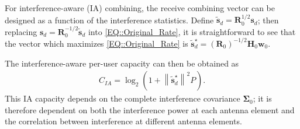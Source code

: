 \documentclass[12pt, draftclsnofoot, onecolumn]{IEEEtran}
\theoremstyle{plain}
\newcommand{\norm}[1]{\left\lVert#1\right\rVert}
\begin{document}
{For interference-aware (IA) combining, the receive combining vector can be designed as a function of the interference statistics. 
%
Define $\tilde{\textbf{s}}_d = \mathbf{R}_0^{1/2} \textbf{s}_d$; then replacing $\textbf{s}_d = \mathbf{R}_0^{-1/2} \tilde{\textbf{s}}_d$ into \eqref{EQ::Original_Rate}, it is straightforward to see that the vector which maximizes \eqref{EQ::Original_Rate} is $\tilde{\textbf{s}}_d^\star = {\left(\mathbf{R}_{0}\right)^{-1/2} \textbf{H}_{0}^{} \textbf{w}_{0}}$. %
%
\iffalse
To derive an expression for the optimal combining vector, we define the noise-and-interference-whitened received signal, based on \eqref{Eq_4r1} and \eqref{B3},  as \vspace{-.1in}
%
\begin{align}\label{Eq_4r1b}
\tilde{\textbf{y}}_0 =\textbf{R}_0^{-1/2} \textbf{y}_{0} = \textbf{R}_0^{-1/2} \textbf{H}_{0} \textbf{w}_{0} \sqrt{P} U_0 + \tilde{\textbf{z}}_{0} 
\end{align} 
where $\tilde{\textbf{z}}_0 = \textbf{R}_0^{-1/2}(\textbf{v}_{0}+\textbf{z}_{0})$ is the whitened noise plus interference, which is a vector of i.i.d. complex normal entries with zero mean and unit variance. We can rewrite this received signal in the form of an equivalent channel model as
%
\begin{align}\label{Eq_4r1_2}
\tilde{\textbf{y}}_{0}^{} &= \mathbf{\tilde{h}}_{0}^{} \sqrt{P} U_{0}+\tilde{\textbf{z}}_{0}, \quad \text{where} \quad {\mathbf{\tilde{h}}_{0}^{}}={\left(\textbf{R}_{0}\right)^{-1/2} \textbf{H}_{0}^{} \textbf{w}_{0}}. &&
\end{align}
\fi
The interference-aware per-user capacity can then be obtained as
\begin{align}\label{RateDEq}
\!\!\!\!\!\!C_{IA}=  {\log_2}{\left( 1+\norm{\tilde{\textbf{s}}_d^\star}^2 P_{} \right)}.
\end{align}
This IA capacity depends on the complete interference covariance $\boldsymbol{\Sigma}_{0}$; it is therefore dependent on both the interference power at each antenna element and the correlation between interference at different antenna elements.
}
\end{document}
